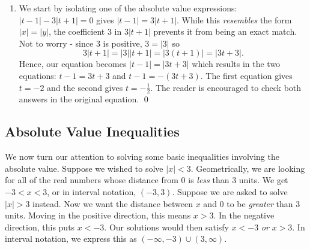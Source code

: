 \documentclass{ximera}
\begin{document}
\begin{example}
\begin{enumerate}
\item We start by isolating one of the absolute value expressions:  $|t-1| - 3|t+1| = 0$ gives $|t-1| = 3|t+1|$.  While this \textit{resembles} the form $|x| = |y|$, the coefficient $3$ in $3|t+1|$ prevents it from being an exact match.  Not to worry - since $3$ is positive, $3 = |3|$ so \[3|t+1| = |3| |t+1| = |3(t+1)| = |3t+3|.\]  Hence, our equation becomes $|t-1| = |3t+3|$ which results in the two equations:  $t-1 = 3t+3$ and $t-1 = -(3t+3)$.  The first equation gives $t = -2$ and the second gives $t = -\frac{1}{2}$.  The reader is encouraged to check both answers in the original equation. \qed

\end{enumerate}

\end{example}


\subsection{Absolute Value Inequalities}
\label{basicabsvalineq}

We now turn our attention to solving some basic inequalities involving the absolute value.  Suppose we wished to solve $|x| < 3$.  Geometrically, we are looking for all of the real numbers whose distance from $0$ is \textit{less} than $3$ units.  We get $-3 < x < 3$, or in interval notation, $(-3,3)$.  Suppose we are asked to solve $|x| > 3$ instead.  Now we want the distance between $x$ and $0$ to be \textit{greater} than $3$ units.  Moving in the positive direction, this means $x > 3$.  In the negative direction, this puts $x < -3$.  Our solutions would then satisfy $x < -3$ \textit{or} $x > 3$.  In interval notation, we express this as $(-\infty, -3) \cup (3, \infty)$.  
\end{document}
